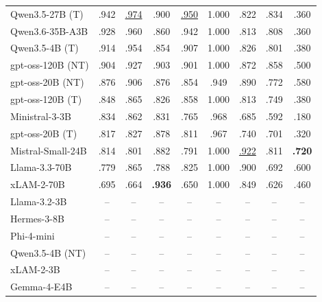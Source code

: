 \begin{table}[t]
\begin{tabular}{l ccccc ccc}
Qwen3.5-27B (T) & .942 & \underline{.974} & .900 & \underline{.950} & 1.000 & .822 & .834 & .360 \\
Qwen3.6-35B-A3B & .928 & .960 & .860 & .942 & 1.000 & .813 & .808 & .360 \\
Qwen3.5-4B (T) & .914 & .954 & .854 & .907 & 1.000 & .826 & .801 & .380 \\
gpt-oss-120B (NT) & .904 & .927 & .903 & .901 & 1.000 & .872 & .858 & .500 \\
gpt-oss-20B (NT) & .876 & .906 & .876 & .854 & .949 & .890 & .772 & .580 \\
gpt-oss-120B (T) & .848 & .865 & .826 & .858 & 1.000 & .813 & .749 & .380 \\
Ministral-3-3B & .834 & .862 & .831 & .765 & .968 & .685 & .592 & .180 \\
gpt-oss-20B (T) & .817 & .827 & .878 & .811 & .967 & .740 & .701 & .320 \\
Mistral-Small-24B & .814 & .801 & .882 & .791 & 1.000 & \underline{.922} & .811 & \textbf{.720} \\
Llama-3.3-70B & .779 & .865 & .788 & .825 & 1.000 & .900 & .692 & .600 \\
xLAM-2-70B & .695 & .664 & \textbf{.936} & .650 & 1.000 & .849 & .626 & .460 \\
Llama-3.2-3B & -- & -- & -- & -- & -- & -- & -- & -- \\
Hermes-3-8B & -- & -- & -- & -- & -- & -- & -- & -- \\
Phi-4-mini & -- & -- & -- & -- & -- & -- & -- & -- \\
Qwen3.5-4B (NT) & -- & -- & -- & -- & -- & -- & -- & -- \\
xLAM-2-3B & -- & -- & -- & -- & -- & -- & -- & -- \\
Gemma-4-E4B & -- & -- & -- & -- & -- & -- & -- & -- \\
\bottomrule
\end{tabular}
\end{table}
